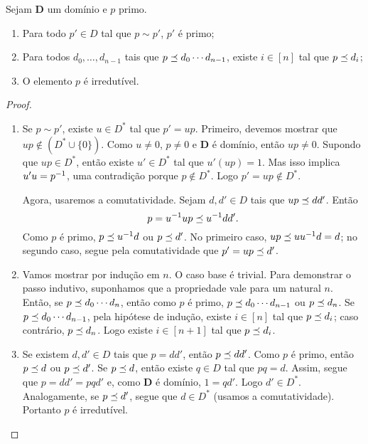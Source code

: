 \begin{proposition}
Sejam $\bm D$ um domínio e $p$ primo.
	\begin{enumerate}
	\item Para todo $p' \in D$ tal que $p \sim p'$, $p'$ é primo;
	\item Para todos $d_0,\ldots,d_{n-1}$ tais que $p \preceq d_0 \cdots d_{n-1}$, existe $i \in [n]$ tal que $p \preceq d_i$;
	\item O elemento $p$ é irredutível.
	\end{enumerate}
\end{proposition}
\begin{proof}
	\begin{enumerate}
	\item Se $p \sim p'$, existe $u \in D^*$ tal que $p'=up$. Primeiro, devemos mostrar que $up \notin (D^* \cup \{0\})$. Como $u \neq 0$, $p \neq 0$ e $\bm D$ é domínio, então $up \neq 0$. Supondo que $up \in D^*$, então existe $u' \in D^*$ tal que $u'(up)=1$. Mas isso implica $u'u=p^{-1}$, uma contradição porque $p \notin D^*$. Logo $p'=up \notin D^*$.

Agora, usaremos a comutatividade. Sejam $d,d' \in D$ tais que $up \preceq dd'$. Então
	\begin{equation*}
	p = u^{-1} up \preceq u^{-1} dd'.
	\end{equation*}
Como $p$ é primo, $p \preceq u^{-1} d$ ou $p \preceq d'$. No primeiro caso, $up \preceq uu^{-1} d=d$; no segundo caso, segue pela comutatividade que $p'=up \preceq d'$.

	\item Vamos mostrar por indução em $n$. O caso base é trivial. Para demonstrar o passo indutivo, suponhamos que a propriedade vale para um natural $n$. Então, se $p \preceq d_0 \cdots d_n$, então como $p$ é primo, $p \preceq d_0 \cdots d_{n-1}$ ou $p \preceq d_n$. Se $p \preceq d_0 \cdots d_{n-1}$, pela hipótese de indução, existe $i \in [n]$ tal que $p \preceq d_i$; caso contrário, $p \preceq d_n$. Logo existe $i \in [n+1]$ tal que $p \preceq d_i$.

	\item Se existem $d,d' \in D$ tais que $p=dd'$, então $p \preceq dd'$. Como $p$ é primo, então $p \preceq d$ ou $p \preceq d'$. Se $p \preceq d$, então existe $q \in D$ tal que $pq=d$. Assim, segue que $p=dd'=pqd'$ e, como $\bm D$ é domínio, $1=qd'$. Logo $d' \in D^*$. Analogamente, se $p \preceq d'$, segue que $d \in D^*$ (usamos a comutatividade). Portanto $p$ é irredutível.
	\end{enumerate}
\end{proof}

